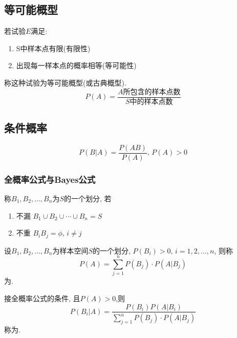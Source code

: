 \subsection{等可能概型}
\begin{definition}
    若试验$E$满足:
    \begin{enumerate}
        \item S中样本点有限(有限性)
        \item 出现每一样本点的概率相等(等可能性)
    \end{enumerate}
    称这种试验为等可能概型(或古典概型).  
    \[ P(A)=\frac{A \text{所包含的样本点数}}{S \text{中的样本点数}} \]
\end{definition}

\subsection{条件概率}
\begin{definition}
    \[ P(B|A)=\frac{P(AB)}{P(A)}, \, P(A)>0 \]
\end{definition}

\subsubsection{全概率公式与Bayes公式}
\begin{definition}
    称$B_1,B_2,\dots,B_n$为$S$的一个划分, 若
    \begin{enumerate}
        \item 不漏 $B_1 \cup B_2 \cup \cdots \cup B_n =S$
        \item 不重 $B_i B_j=\phi, \, i\ne j $
    \end{enumerate}
\end{definition}

\begin{theorem}
    设$B_1,B_2,\dots,B_n$为样本空间$S$的一个划分, $P(B_i)>0, \, i=1,2,\dots,n$, 则称
    \[ P(A)=\sum_{j=1}^n P(B_j)\cdot P(A|B_j)\]
    为.
\end{theorem}

\begin{theorem}
    接全概率公式的条件, 且$P(A)>0$,则
    \[ P(B_i|A)=\frac{P(B_i)P(A|B_i)}{\sum_{j=1}^n P(B_j)\cdot P(A|B_j)}\]
    称为.
\end{theorem}

